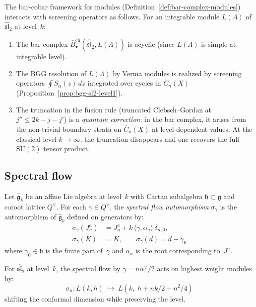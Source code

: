 \begin{remark}
\label{rem:screening-bar-module}
The bar-cobar framework for modules
(Definition~\ref{def:bar-complex-modules}) interacts with
screening operators as follows.  For an integrable module
$L(\Lambda)$ of $\widehat{\mathfrak{sl}}_2$ at level~$k$:
\begin{enumerate}[label=(\roman*)]
\item The bar complex
  $\bar{B}^{\mathrm{ch}}_\bullet(\widehat{\mathfrak{sl}}_2,
  L(\Lambda))$ is acyclic (since $L(\Lambda)$ is simple at
  integrable level).
\item The BGG resolution of $L(\Lambda)$ by Verma modules
  is realized by screening operators $\oint S_\alpha(z)\,dz$
  integrated over cycles in $\overline{C}_n(X)$
  (Proposition~\ref{prop:bgg-sl2-level1}).
\item The truncation in the fusion rule (truncated Clebsch--Gordan
  at $j'' \leq 2k - j - j'$) is a \emph{quantum correction}:
  in the bar complex, it arises from the non-trivial boundary
  strata on $\overline{C}_n(X)$ at level-dependent values.
  At the classical level $k \to \infty$, the truncation disappears
  and one recovers the full $\mathrm{SU}(2)$ tensor product.
\end{enumerate}
\end{remark}

\subsection{Spectral flow}

\begin{definition}\label{def:spectral-flow}
Let $\widehat{\mathfrak{g}}_k$ be an affine Lie algebra at level~$k$
with Cartan subalgebra $\mathfrak{h} \subset \mathfrak{g}$ and coroot
lattice $Q^\vee$.  For each $\gamma \in Q^\vee$, the \emph{spectral
flow automorphism} $\sigma_\gamma$ is the automorphism of
$\widehat{\mathfrak{g}}_k$ defined on generators by:
\begin{align}
\sigma_\gamma(J^a_n) &= J^a_n + k\,\langle \gamma, \alpha_a \rangle\,
\delta_{n,0}, \\
\sigma_\gamma(K) &= K, \qquad
\sigma_\gamma(d) = d - \gamma_0
\end{align}
where $\gamma_0 \in \mathfrak{h}$ is the finite part of~$\gamma$ and
$\alpha_a$ is the root corresponding to~$J^a$.

For $\widehat{\mathfrak{sl}}_2$ at level~$k$, the spectral flow by
$\gamma = n \alpha^\vee/2$ acts on highest weight modules by:
\[
\sigma_n\colon L(k, h) \;\longmapsto\; L(k,\; h + nk/2 + n^2/4)
\]
shifting the conformal dimension while preserving the level.
\end{definition}

